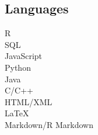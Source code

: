 \documentclass[letterpaper]{deedy-resume} %
\begin{document}
\begin{minipage}[t]{0.33\textwidth}
\sectionspace %
\vspace{3pt}
\subsection{Languages}
R\\
SQL\\
\vspace{3pt}
JavaScript\\
Python\\
Java\\
C/C++\\
\vspace{3pt}
HTML/XML\\
\LaTeX\\
Markdown/R Markdown



\end{minipage} %
\hfill
%
%
\end{document}

